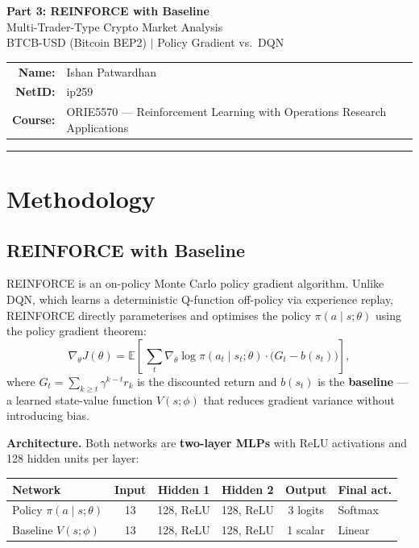 \documentclass[11pt,a4paper]{article}
\begin{document}
\begin{center}
  {\LARGE\bfseries Part 3: REINFORCE with Baseline}\\[4pt]
  {\large Multi-Trader-Type Crypto Market Analysis}\\[8pt]
  {\large BTCB-USD (Bitcoin BEP2) $\mid$ Policy Gradient vs.\ DQN}\\[12pt]
  \begin{tabular}{rl}
    \textbf{Name:}   & Ishan Patwardhan \\
    \textbf{NetID:}  & ip259 \\
    \textbf{Course:} & ORIE5570 --- Reinforcement Learning with Operations Research Applications \\
  \end{tabular}
\end{center}
\vspace{-4pt}\rule{\linewidth}{0.8pt}\vspace{6pt}

\section{Methodology}

\subsection{REINFORCE with Baseline}

REINFORCE is an on-policy Monte Carlo policy gradient algorithm.  Unlike DQN, which learns a deterministic Q-function off-policy via experience replay, REINFORCE directly parameterises and optimises the policy $\pi(a\mid s;\theta)$ using the policy gradient theorem:
\[
  \nabla_\theta J(\theta)
  = \mathbb{E}\!\left[\,\sum_t \nabla_\theta \log \pi(a_t\mid s_t;\theta)
    \cdot \bigl(G_t - b(s_t)\bigr)\right],
\]
where $G_t = \sum_{k\ge t}\gamma^{k-t}r_k$ is the discounted return and $b(s_t)$ is the \textbf{baseline} --- a learned state-value function $V(s;\phi)$ that reduces gradient variance without introducing bias.

\medskip
\textbf{Architecture.}  Both networks are \textbf{two-layer MLPs} with ReLU activations and 128 hidden units per layer:

\begin{table}[h!]
\centering
\small
\begin{tabular}{lccccl}
\toprule
\textbf{Network} & \textbf{Input} & \textbf{Hidden 1} & \textbf{Hidden 2} & \textbf{Output} & \textbf{Final act.}\\
\midrule
Policy $\pi(a\mid s;\theta)$ & 13 & 128, ReLU & 128, ReLU & 3 logits & Softmax\\
Baseline $V(s;\phi)$        & 13 & 128, ReLU & 128, ReLU & 1 scalar  & Linear\\
\bottomrule
\end{tabular}
\end{table}
\end{document}
